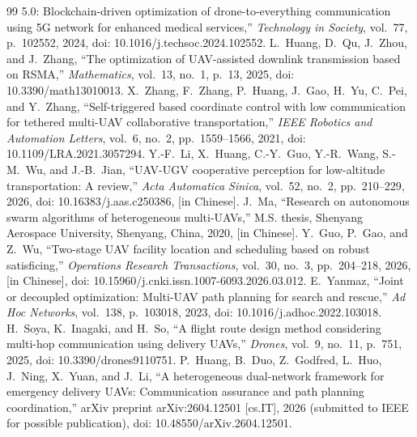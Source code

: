 \documentclass[journal]{IEEEtran}
\begin{document}
\begin{thebibliography}{99}
5.0: Blockchain-driven optimization of drone-to-everything communication using 5G
network for enhanced medical services,'' \emph{Technology in Society}, vol.~77,
p.~102552, 2024, doi: 10.1016/j.techsoc.2024.102552.
 L.~Huang, D.~Qu, J.~Zhou, and J.~Zhang, ``The optimization of
UAV-assisted downlink transmission based on RSMA,'' \emph{Mathematics}, vol.~13,
no.~1, p.~13, 2025, doi: 10.3390/math13010013.
 X.~Zhang, F.~Zhang, P.~Huang, J.~Gao, H.~Yu, C.~Pei, and
Y.~Zhang,
``Self-triggered based coordinate control with low communication for tethered
multi-UAV collaborative transportation,'' \emph{IEEE Robotics and Automation
Letters}, vol.~6, no.~2, pp.~1559--1566, 2021, doi: 10.1109/LRA.2021.3057294.
 Y.-F.~Li, X.~Huang, C.-Y.~Guo, Y.-R.~Wang, S.-M.~Wu, and
J.-B.~Jian, ``UAV-UGV cooperative perception for low-altitude transportation:
A review,''
\emph{Acta Automatica Sinica}, vol.~52, no.~2, pp.~210--229, 2026,
doi: 10.16383/j.aas.c250386, [in Chinese].
 J.~Ma, ``Research on autonomous swarm algorithms of
heterogeneous multi-UAVs,'' M.S. thesis, Shenyang Aerospace University, Shenyang,
China, 2020, [in Chinese].
 Y.~Guo, P.~Gao, and Z.~Wu, ``Two-stage UAV facility location and
scheduling based on robust satisficing,'' \emph{Operations
Research Transactions}, vol.~30, no.~3, pp.~204--218, 2026, [in Chinese],
doi: 10.15960/j.cnki.issn.1007-6093.2026.03.012.
 E.~Yanmaz, ``Joint or decoupled optimization: Multi-UAV path
planning for search and rescue,'' \emph{Ad Hoc Networks}, vol.~138, p.~103018,
2023, doi: 10.1016/j.adhoc.2022.103018.
 H.~Soya, K.~Inagaki, and H.~So, ``A flight route design method
considering multi-hop communication using delivery UAVs,'' \emph{Drones},
vol.~9, no.~11, p.~751, 2025, doi: 10.3390/drones9110751.
 P.~Huang, B.~Duo, Z.~Godfred, L.~Huo, J.~Ning,
X.~Yuan, and J.~Li, ``A heterogeneous dual-network framework for emergency
delivery UAVs: Communication assurance and path planning coordination,''
arXiv preprint arXiv:2604.12501 [cs.IT], 2026 (submitted to IEEE for
possible publication), doi: 10.48550/arXiv.2604.12501.
\end{thebibliography}
\end{document}
